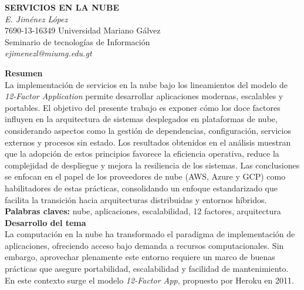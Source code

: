 \documentclass[12pt,letterpaper]{article}
\begin{document}
\begin{center}
\textbf{\MakeUppercase{SERVICIOS EN LA NUBE}} \\[6pt]
\textit{E. Jiménez López} \\[4pt]
7690-13-16349  Universidad Mariano Gálvez \\[2pt]
Seminario de tecnologías de Información \\[2pt]
\textit{ejimenezl@miumg.edu.gt}
\end{center}

\textbf{Resumen}  \\
La implementación de servicios en la nube bajo los lineamientos del modelo de \textit{12-Factor Application} permite desarrollar aplicaciones modernas, escalables y portables. El objetivo del presente trabajo es exponer cómo los doce factores influyen en la arquitectura de sistemas desplegados en plataformas de nube, considerando aspectos como la gestión de dependencias, configuración, servicios externos y procesos sin estado. Los resultados obtenidos en el análisis muestran que la adopción de estos principios favorece la eficiencia operativa, reduce la complejidad de despliegue y mejora la resiliencia de los sistemas. Las conclusiones se enfocan en el papel de los proveedores de nube (AWS, Azure y GCP) como habilitadores de estas prácticas, consolidando un enfoque estandarizado que facilita la transición hacia arquitecturas distribuidas y entornos híbridos.  \\

\textbf{Palabras claves:} nube, aplicaciones, escalabilidad, 12 factores, arquitectura  \\

\textbf{Desarrollo del tema} \\ 
La computación en la nube ha transformado el paradigma de implementación de aplicaciones, ofreciendo acceso bajo demanda a recursos computacionales. Sin embargo, aprovechar plenamente este entorno requiere un marco de buenas prácticas que asegure portabilidad, escalabilidad y facilidad de mantenimiento. En este contexto surge el modelo \textit{12-Factor App}, propuesto por Heroku en 2011.  \\
\end{document}
